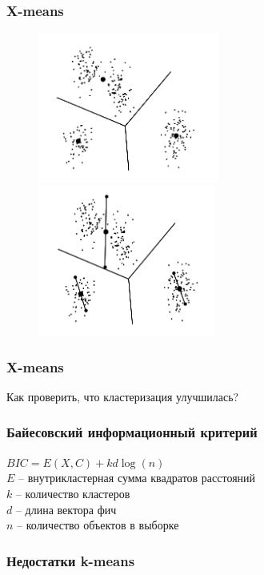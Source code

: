 \documentclass[12pt]{beamer}
\begin{document}
\begin{frame}\frametitle{X-means}

\begin{figure}[htbp]
  \includegraphics[height=140pt, keepaspectratio = true]{images/x-means}  
    \includegraphics[height=140pt, keepaspectratio = true]{images/x-means-1}
\end{figure}
\end{frame}

\begin{frame}\frametitle{X-means}
Как проверить, что кластеризация улучшилась?
\end{frame}

\begin{frame}\frametitle{Байесовский информационный критерий}
$BIC = E(X, C)  + k d \log(n)$\\
\vspace{5mm}
$E$ -- внутрикластерная сумма квадратов расстояний\\
$k$ -- количество кластеров\\
$d$ -- длина вектора фич\\
$n$ -- количество объектов в выборке\\

\end{frame}

\begin{frame}\frametitle{Недостатки k-means}
\end{frame}
\end{document}
